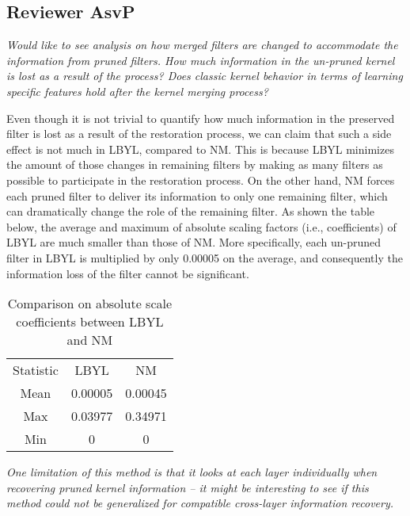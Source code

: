 \subsection*{Reviewer AsvP}


\textit{Would like to see analysis on how merged filters are changed to accommodate the information from pruned filters. How much information in the un-pruned kernel is lost as a result of the process? Does classic kernel behavior in terms of learning specific features hold after the kernel merging process?}

Even though it is not trivial to quantify how much information in the preserved filter is lost as a result of the restoration process, we can claim that such a side effect is not much in LBYL, compared to NM. This is because LBYL minimizes the amount of those changes in remaining filters by making as many filters as possible to participate in the restoration process. On the other hand, NM forces each pruned filter to deliver its information to only one remaining filter, which can dramatically change the role of the remaining filter. As shown the table below, the average and maximum of absolute scaling factors (i.e., coefficients) of LBYL are much smaller than those of NM. More specifically, each un-pruned filter in LBYL is multiplied by only 0.00005 on the average, and consequently the information loss of the filter cannot be significant.
\begin{table}[h]
\centering
\scriptsize
\begin{tabular}{c||c|c}\Xhline{2\arrayrulewidth}
Statistic& LBYL & NM \\ \Xhline{2\arrayrulewidth}
Mean & 0.00005 & 0.00045 \\ \hline
Max & 0.03977 & 0.34971 \\ \hline
Min & 0 & 0 \\ \hline
\end{tabular}%
\label{cov:tab:scale}
\vspace{2mm}
\caption{Comparison on absolute scale coefficients between LBYL and NM}
\end{table}



\textit{One limitation of this method is that it looks at each layer individually when recovering pruned kernel information -- it might be interesting to see if this method could not be generalized for compatible cross-layer information recovery.}

